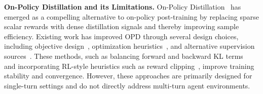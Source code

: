 \documentclass{article} %
\begin{document}
\textbf{On-Policy Distillation and its Limitations.}
On-Policy Distillation~\citep{agarwal2024policy, lu2025onpolicydistillation} has emerged as a compelling alternative to on-policy post-training by replacing sparse scalar rewards with dense distillation signals and thereby improving sample efficiency.
Existing work has improved OPD through several design choices, including objective design~\citep{jang2026stable, jin2026entropy}, optimization heuristics~\citep{ko2026scaling}, and alternative supervision sources~\citep{ye2026policy, zhao2026self}. 
These methods, such as balancing forward and backward KL terms~\citep{jang2026stable, jin2026entropy} and incorporating RL-style heuristics such as reward clipping~\citep{ko2026scaling}, improve training stability and convergence.
However, these approaches are primarily designed for single-turn settings and do not directly address multi-turn agent environments.

\end{document}
